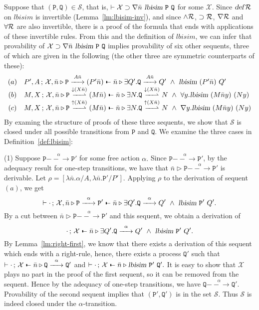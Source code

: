 \documentclass{acmtrans2m}
\def\Sscr{{\mathcal S}}
\def\Xscr{{\mathcal X}}
\def\Ppi{{\mathtt P}}
\def\Qpi{{\mathtt Q}}
\def\relbar{\mathrel{\smash-}}
\def\joinrelm{\mathrel{\mkern-3.2mu}}
\def\tailpiece{\kern 1pt\vrule height 1ex width 0.3ex depth -.25ex}
\def\seqsym{\mathrel{\tailpiece\joinrelm\relbar}}
\newcommand{\Judg}[2]{#1\triangleright#2}
\newcommand{\NSeq}[3]{#1\,;\,#2 \seqsym #3}
\newcommand{\lbisim}[2]{\hbox{\sl lbisim}~#1~#2}
\newcommand{\defR}{\hbox{\sl def\/{}}{\cal R}}
\newcommand{\forallR}{\forall{\cal R}}
\newcommand{\inact}{\mathop{\downarrow}}
\newcommand{\landR}{\land{\cal R}}
\newcommand{\nablaR}{\nabla{\cal R}}
\newcommand{\oimpR}{\oimp{\cal R}}
\newcommand{\oimp}{\supset}
\newcommand{\one  }[3]{#1\stackrel{#2}{-\!\!-\!\!\!\rightarrow    } #3}
\newcommand{\onep }[3]{#1\stackrel{#2}{-\!\!-\!\!\!\rightharpoonup} #3}
\newcommand{\outact}{\mathop{\uparrow}}
\begin{document}
Suppose that $(\Ppi, \Qpi) \in \Sscr$, that is, 
$\vdash \Xscr \oimp \nabla \bar{n}\ \lbisim{\Ppi}{\Qpi}$ for some $\Xscr$. 
Since $\defR$ on $lbisim$ is invertible (Lemma~\ref{lm:lbisim-inv}), and since
$\landR$, $\oimpR$, $\nablaR$ and $\forallR$ are also invertible, there is a proof of the formula that ends 
with applications of these invertible rules. From this and the definition of $lbisim$, 
we can infer that provability of $\Xscr \oimp \nabla \bar n \ \lbisim \Ppi \Qpi$
implies provability of six other sequents, three of which are given 
in the following (the other three are symmetric counterparts of these):
$$
\begin{array}{cl}
(a) & \NSeq{P',A}{\Xscr, \Judg{\bar{n}}{\one{\Ppi}{A\bar{n}}{(P'\bar{n})}}}
                {\Judg{\bar{n}}{\exists Q'.\one{\Qpi}{A\bar{n}}{Q'}~\land~\lbisim{(P'\bar{n})}{Q'}}} \\
(b) & \NSeq{M,X}{\Xscr, \Judg{\bar{n}}{\onep{\Ppi}{\inact (X\bar{n})}{(M\bar{n})}}}
                {\Judg{\bar{n}}{\exists N.
                    \onep{\Qpi}{\inact (X\bar{n})}{N}~\land~
                    \forall y. \lbisim{(M\bar{n}y)}{(Ny)} 
                }} \\   
(c) & \NSeq{M,X}{\Xscr,\Judg{\bar{n}}{\onep{\Ppi}{\outact (X\bar{n})}{(M\bar{n})}}}
                {\Judg{\bar{n}}{\exists N.\onep{\Qpi}{\outact (X\bar{n})}{N}~\land~
                 \nabla y.\lbisim{(M \bar{n}y)}{(Ny)}               }
                }                       
\end{array}
$$
By examing the structure of proofs of these three sequents, we show 
that $\Sscr$ is closed under all possible transitions from $\Ppi$ and $\Qpi.$
We examine the three cases in Definition~\ref{def:lbisim}:

\noindent (1) Suppose $\one{\Ppi}{\alpha}{\Ppi'}$ for some free action $\alpha.$ 
Since $\one{\Ppi}{\alpha}{\Ppi'}$, by the adequacy result for one-step transitions,
we have that $\Judg{\bar n}{\one{\Ppi}{\alpha}{\Ppi'}}$ is derivable.
Let $\rho = [\lambda \bar n. \alpha / A, \lambda \bar n.\Ppi' / P']$. Applying $\rho$ to the derivation
of sequent $(a)$, we get 
$$
\vdash \NSeq{\cdot}{\Xscr, \Judg{\bar{n}}{\one{\Ppi}{\alpha}{\Ppi'}}}
                {\Judg{\bar{n}}{\exists Q'.\one{\Qpi}{\alpha}{Q'}~\land~\lbisim{\Ppi'}{Q'}}}. 
$$
By a cut between $\Judg{\bar n}{\one{\Ppi}{\alpha}{\Ppi'}}$ and this sequent,
we obtain a derivation of 
$$
\NSeq{\cdot}{\Xscr}{\Judg{\bar{n}}{\exists Q'.\one{\Qpi}{\alpha}{Q'}~\land~\lbisim{\Ppi'}{Q'}}}. 
$$
By Lemma~\ref{lm:right-first}, we know that there exists a derivation of this sequent
which ends with a right-rule, hence, there exists a process $\Qpi'$ such that
$\vdash \NSeq{\cdot}{\Xscr}{\Judg{\bar n}{\one{\Qpi}{\alpha}{\Qpi'}}}$
and
$\vdash \NSeq{\cdot}{\Xscr}{\Judg{\bar n}{\lbisim{\Ppi'}{\Qpi'}}.}$
It is easy to show that $\Xscr$ plays no part in the proof of the first sequent,
so it can be removed from the sequent. Hence by the adequacy of one-step transitions,
we have $\one{\Qpi}{\alpha}{\Qpi'}$. Provability of the second sequent implies
that $(\Ppi', \Qpi')$ is in the set $\Sscr$.  Thus
$\Sscr$ is indeed closed under the $\alpha$-transition.
\end{document}
